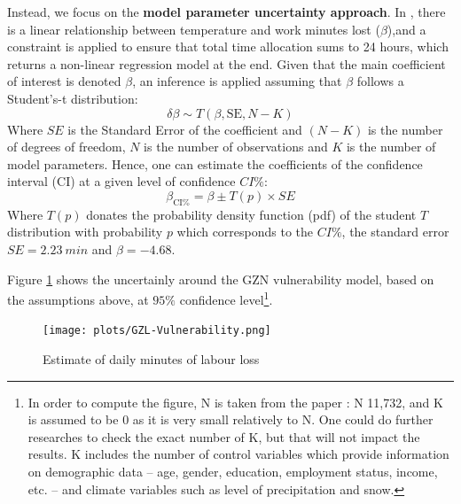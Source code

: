\documentclass[a4paper,11pt]{extarticle} %
\theoremstyle{definition}
\begin{document}
Instead, we focus on the \textbf{model parameter uncertainty approach}. In \cite{ZhangAndShindell:2021}, there is a linear relationship between temperature and work minutes lost ($\beta$),and a constraint is applied to ensure that total time allocation sums to 24 hours, which returns a non-linear regression model at the end. Given that the main coefficient of interest is denoted $\beta$, an inference is applied assuming that $\beta$ follows a Student's-t distribution:
\begin{equation}
 \label{Eq:uncertaintyStudentT}
 \delta \beta \sim T(\beta, \mathrm{SE}, N-K)
\end{equation}
Where $SE$ is the Standard Error of the coefficient and $(N-K)$ is the number of degrees of freedom, $N$ is the number of observations and $K$ is the number of model parameters. Hence, one can estimate the coefficients of the confidence interval (CI) at a given level of confidence $CI\%$:
\begin{equation}
 \label{Eq:CIStudent}
 \beta_{\mathrm{CI\%}} = \beta \pm T(p) \times SE
\end{equation}
Where $T(p)$ donates the probability density function (pdf) of the student $T$ distribution with probability $p$ which corresponds to the $CI\%$, the standard error $SE = 2.23 \ min$ and $\beta =  - 4.68$.


Figure \ref{fig:GZL-Vulnerability} shows the uncertainly around the GZN vulnerability model, based on the assumptions above, at $95\%$ confidence level\footnote{In order to compute the figure, N is taken from the paper \cite{TemperatureAndWork:2021}: N 11,732, and K is assumed to be 0 as it is very small relatively to N. One could do further researches to check the exact number of K, but that will not impact the results. K includes the number of control variables which provide information on demographic data -- age, gender, education, employment status, income, etc. -- and climate variables such as level of precipitation and snow.}.
\begin{figure}[h]
    \centering
    \texttt{[image: plots/GZL-Vulnerability.png]}
    \caption{Estimate of daily minutes of labour loss}
    \label{fig:GZL-Vulnerability}
\end{figure}
\end{document}
